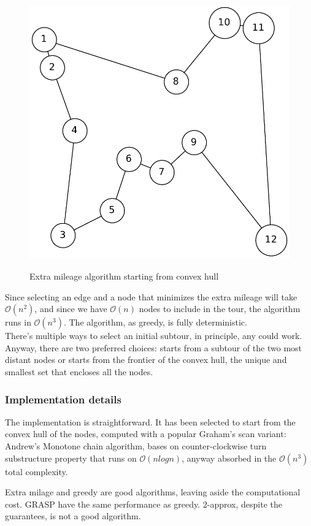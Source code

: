 \begin{figure}[h]
\begin{minipage}{.33\textwidth}
        \includegraphics[width=0.8\linewidth]{figures/heurc}
        \label{fig:sub2}
    \end{minipage}
    \caption{\centering Extra mileage algorithm starting from convex hull}
\end{figure}

Since selecting an edge and a node that minimizes the extra mileage will take
$\mathcal{O}(n^2)$, and since we have $\mathcal{O}(n)$ nodes to include in the
tour, the algorithm runs in $\mathcal{O}(n^3)$. The algorithm, as greedy, is
fully deterministic.\\
There's multiple ways to select an initial subtour, in principle, any could work.
Anyway, there are two preferred choices: starts from a subtour of the two most
distant nodes or starts from the frontier of the convex hull, the unique and
smallest set that encloses all the nodes.

\subsubsection{Implementation details}
The implementation is straightforward. It has been selected to start from the
convex hull of the nodes, computed with a popular Graham's scan variant:
Andrew's Monotone chain algorithm, bases on counter-clockwise turn substructure
property that runs on $\mathcal{O}(nlogn)$, anyway absorbed in the
$\mathcal{O}(n^3)$ total complexity.

\begin{claim}
    Extra milage and greedy are good algorithms, leaving aside the computational
    cost. GRASP have the same performance as greedy. 2-approx, despite the
    guarantees, is not a good algorithm.
\end{claim}

